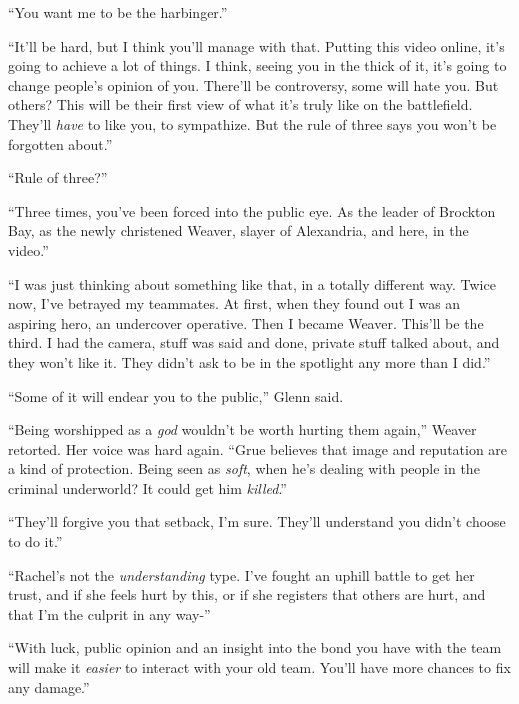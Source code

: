 ``You want me to be the harbinger.''



``It'll be hard, but I think you'll manage with that.  Putting this video online, it's going to achieve a lot of things.  I think, seeing you in the thick of it, it's going to change people's opinion of you.  There'll be controversy, some will hate you.  But others?  This will be their first view of what it's truly like on the battlefield.  They'll \emph{have} to like you, to sympathize.  But the rule of three says you won't be forgotten about.''



``Rule of three?''



``Three times, you've been forced into the public eye.  As the leader of Brockton Bay, as the newly christened Weaver, slayer of Alexandria, and here, in the video.''



``I was just thinking about something like that, in a totally different way.  Twice now, I've betrayed my teammates.  At first, when they found out I was an aspiring hero, an undercover operative.  Then I became Weaver.  This'll be the third.  I had the camera, stuff was said and done, private stuff talked about, and they won't like it.  They didn't ask to be in the spotlight any more than I did.''



``Some of it will endear you to the public,'' Glenn said.



``Being worshipped as a \emph{god} wouldn't be worth hurting them again,'' Weaver retorted.  Her voice was hard again.  ``Grue believes that image and reputation are a kind of protection.  Being seen as \emph{soft}, when he's dealing with people in the criminal underworld?  It could get him \emph{killed}.''



``They'll forgive you that setback, I'm sure.  They'll understand you didn't choose to do it.''



``Rachel's not the \emph{understanding} type.  I've fought an uphill battle to get her trust, and if she feels hurt by this, or if she registers that others are hurt, and that I'm the culprit in any way-''



``With luck, public opinion and an insight into the bond you have with the team will make it \emph{easier} to interact with your old team.  You'll have more chances to fix any damage.''



